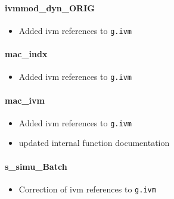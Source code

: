 \documentclass[12pt]{article}
\begin{document}
\paragraph{ivmmod\_dyn\_ORIG}
	\begin{itemize}
		\item Added ivm references to \verb|g.ivm|
	\end{itemize}	
\paragraph{mac\_indx}
	\begin{itemize}
		\item Added ivm references to \verb|g.ivm|
	\end{itemize}	
\paragraph{mac\_ivm}
	\begin{itemize}
		\item Added ivm references to \verb|g.ivm|
		\item updated internal function documentation
	\end{itemize}	
	
\paragraph{s\_simu\_Batch}
	\begin{itemize}
		\item Correction of ivm references to \verb|g.ivm|
	\end{itemize}
		
\end{document}
